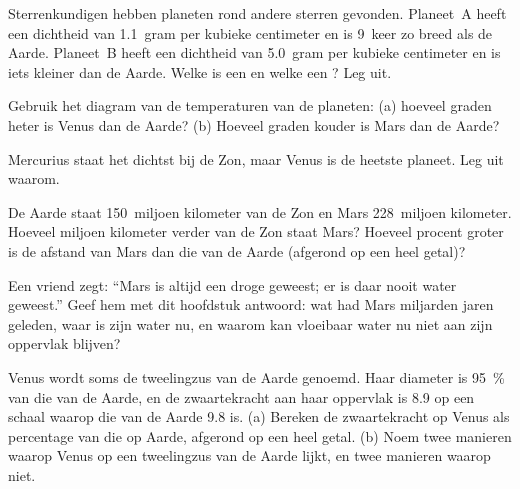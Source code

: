 \begin{exercise}[$\star\star$]\label{exo:g6:earth-a-planet:7}
Sterrenkundigen hebben planeten rond andere sterren gevonden. Planeet~A
heeft een dichtheid van 1.1~gram per kubieke centimeter en is 9~keer zo
breed als de Aarde. Planeet~B heeft een dichtheid van 5.0~gram per kubieke
centimeter en is iets kleiner dan de Aarde. Welke is een  en
welke een ? Leg uit.
\end{exercise}

\begin{exercise}[$\star\star$]\label{exo:g6:earth-a-planet:8}
Gebruik het diagram van de temperaturen van de planeten: (a) hoeveel graden
heter is Venus dan de Aarde? (b) Hoeveel graden kouder is Mars dan de
Aarde?
\end{exercise}

\begin{exercise}[$\star\star$]\label{exo:g6:earth-a-planet:9}
Mercurius staat het dichtst bij de Zon, maar Venus is de heetste planeet.
Leg uit waarom.
\end{exercise}

\begin{exercise}[$\star\star$]\label{exo:g6:earth-a-planet:10}
De Aarde staat 150~miljoen kilometer van de Zon en Mars 228~miljoen
kilometer. Hoeveel miljoen kilometer verder van de Zon staat Mars? Hoeveel
procent groter is de afstand van Mars dan die van de Aarde (afgerond op een
heel getal)?
\end{exercise}

\begin{exercise}[$\star\star\star$]\label{exo:g6:earth-a-planet:11}
Een vriend zegt: ``Mars is altijd een droge  geweest; er is daar
nooit water geweest.'' Geef hem met dit hoofdstuk antwoord: wat had Mars
miljarden jaren geleden, waar is zijn water nu, en waarom kan vloeibaar
water nu niet aan zijn oppervlak blijven?
\end{exercise}

\begin{exercise}[$\star\star\star$]\label{exo:g6:earth-a-planet:12}
Venus wordt soms de tweelingzus van de Aarde genoemd. Haar diameter is
95~\% van die van de Aarde, en de zwaartekracht aan haar oppervlak is 8.9
op een schaal waarop die van de Aarde 9.8 is. (a) Bereken de zwaartekracht
op Venus als percentage van die op Aarde, afgerond op een heel getal.
(b) Noem twee manieren waarop Venus op een tweelingzus van de Aarde lijkt,
en twee manieren waarop niet.
\end{exercise}

